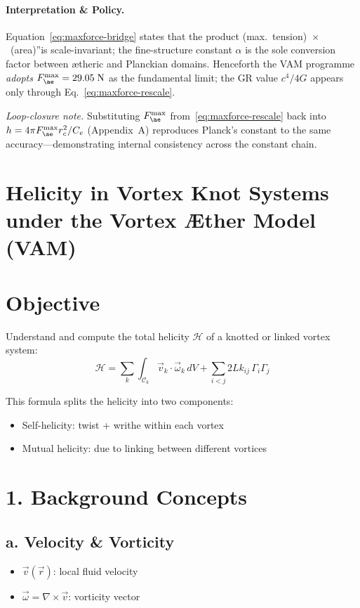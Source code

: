 \paragraph{Interpretation \& Policy.} Equation~\eqref{eq:maxforce-bridge} states that the product \grqq(max.~tension)~$\times$~(area)\textquotedblright is scale-invariant; the fine-structure constant \(\alpha\) is the sole conversion factor between ætheric and Planckian domains.  Henceforth the VAM programme \emph{adopts} \(F_{\ae}^{\max}=29.05\;\mathrm{N}\) as the fundamental limit; the GR value \(c^{4}/4G\) appears only through Eq.~\eqref{eq:maxforce-rescale}.

\smallskip
\noindent\emph{Loop-closure note.}  Substituting \(F_{\ae}^{\max}\) from~\eqref{eq:maxforce-rescale} back into \(h=4\pi F_{\ae}^{\max}r_{c}^{2}/C_{e}\) (Appendix~A) reproduces    Planck's constant to the same accuracy—demonstrating internal consistency across the constant chain.


\section{Helicity in Vortex Knot Systems under the Vortex Æther Model (VAM)}\label{sec:calculate-knot-helicity}

\section*{Objective}
Understand and compute the total helicity $\mathcal{H}$ of a knotted or linked vortex system:
\begin{equation}
    \boxed{
        \mathcal{H} = \sum_{k} \int_{\mathcal{C}_k} \vec{v}_k \cdot \vec{\omega}_k \, dV + \sum_{i<j} 2Lk_{ij} \, \Gamma_i \Gamma_j
    }
\end{equation}

This formula splits the helicity into two components:
\begin{itemize}
    \item Self-helicity: twist + writhe within each vortex
    \item Mutual helicity: due to linking between different vortices
\end{itemize}

\section*{1. Background Concepts}
\subsection*{a. Velocity \& Vorticity}
\begin{itemize}
    \item $\vec{v}(\vec{r})$: local fluid velocity
    \item $\vec{\omega} = \nabla \times \vec{v}$: vorticity vector
\end{itemize}

